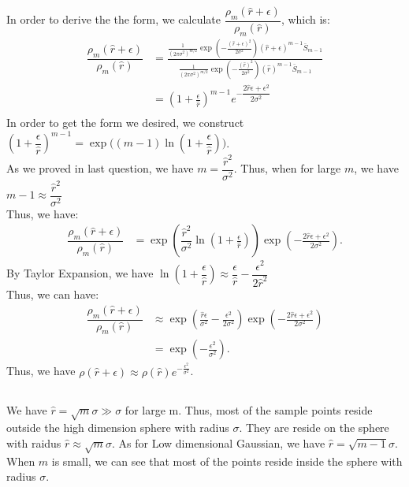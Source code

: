 \documentclass{article}
\begin{document}
\subsection{}
In order to derive the the form, we calculate $ \dfrac{\rho_m(\hat r + \epsilon)}{\rho_m(\hat r)} $, which is:
\begin{align*}
    \dfrac{\rho_m(\hat r + \epsilon)}{\rho_m(\hat r)} &=    \frac{\frac{1}{(2\pi \sigma ^2 )^{m/2}}\exp {\left(-\frac{(\hat r + \epsilon )^2}{2\sigma ^2}\right)}(\hat r + \epsilon )^{m - 1}\bar S_{m - 1}}{\frac{1}{(2\pi \sigma ^2 )^{m/2}}\exp {\left(-\frac{(\hat r)^2}{2\sigma ^2}\right)}(\hat r )^{m - 1}\bar S_{m - 1}}\\
                                                      &= \left(1 + \frac{\epsilon }{\hat r}\right)^{m - 1}e^{-\dfrac{ 2\hat r \epsilon +  \epsilon ^2}{2\sigma^2}}\\
\end{align*}
In order to get the form we desired, we construct $ \left(1 + \dfrac{\epsilon }{\hat r}\right)^{m - 1} = \exp{((m-1)\ln{(1+\dfrac{\epsilon }{\hat r}))}} $.\\
As we proved in last question, we have $ m = \dfrac{\hat r^2}{\sigma ^2} $. Thus, when for large $ m $, we have $ m - 1 \approx  \dfrac{\hat r^2}{\sigma ^2}  $\\
Thus, we have:\\
\begin{align*}
    \dfrac{\rho_m(\hat r + \epsilon)}{\rho_m(\hat r)} &= \exp\left(\dfrac{\hat r^2}{\sigma ^2}\ln(1+\frac{\epsilon }{\hat r})\right)\exp{\left(-\frac{2\hat r \epsilon  + \epsilon ^2 }{2\sigma^2}\right)}.
\end{align*}
By Taylor Expansion, we have $ \ln(1+\dfrac{\epsilon }{\hat r}) \approx \dfrac{\epsilon }{\hat r} - \dfrac{\epsilon ^2}{2\hat r^2}  $\\
Thus, we can have:\\
\begin{align*}
    \dfrac{\rho_m(\hat r + \epsilon)}{\rho_m(\hat r)} &\approx \exp\left(\frac{\hat r \epsilon }{\sigma ^2 }- \frac{\epsilon ^2 }{2\sigma ^2}\right)\exp{\left(-\frac{2\hat r \epsilon  + \epsilon ^2 }{2\sigma^2}\right)}\\
                                                      &=\exp{\left(-\frac{\epsilon ^2 }{\sigma ^2}\right)}.
\end{align*}
Thus, we have $ \rho{(\hat r +\epsilon )} \approx \rho(\hat r)e^{-\frac{\epsilon ^2 }{\sigma^2}} $.
\subsection{}
We have $ \hat r = \sqrt{m}\sigma \gg \sigma  $ for large m. Thus, most of the sample points reside outside the high dimension sphere with radius $ \sigma $. They are reside on the sphere with raidus $ \hat r \approx \sqrt{m}\sigma  $. As for Low dimensional Gaussian, we have $ \hat r = \sqrt{m-1}\sigma  $. When $ m $ is small, we can see that most of the points reside inside the sphere with radius $ \sigma  $.
\end{document}
